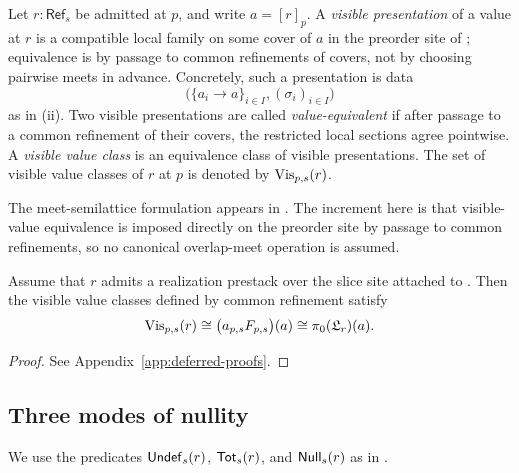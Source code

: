 \begin{definition}\label{def:visible-value-classes}
Let $r:\mathsf{Ref}_s$ be admitted at $p$, and write $a=[r]_p$. A \emph{visible presentation} of a value at $r$ is a compatible local family on some cover of $a$ in the preorder site of ; equivalence is by passage to common refinements of covers, not by choosing pairwise meets in advance. Concretely, such a presentation is data
\[
\bigl(\{a_i\to a\}_{i\in I},(\sigma_i)_{i\in I}\bigr)
\]
as in (ii). Two visible presentations are called \emph{value-equivalent} if after passage to a common refinement of their covers, the restricted local sections agree pointwise. A \emph{visible value class} is an equivalence class of visible presentations. The set of visible value classes of $r$ at $p$ is denoted by $\mathrm{Vis}_{p,s}(r)$.
\end{definition}

\begin{remark}
The meet-semilattice formulation appears in \cite[Definition~4.19]{MaZhang2026ConditionalGluingFailure}. The increment here is that visible-value equivalence is imposed directly on the preorder site by passage to common refinements, so no canonical overlap-meet operation is assumed.
\end{remark}

\begin{proposition}\label{thm:visible-value-components}
Assume that $r$ admits a realization prestack over the slice site attached to . Then the visible value classes defined by common refinement satisfy
\[
\mathrm{Vis}_{p,s}(r)\cong \bigl(a_{p,s}F_{p,s}\bigr)(a)\cong \pi_0(\mathfrak L_r)(a).
\]
\end{proposition}

\begin{proof}
See Appendix~\ref{app:deferred-proofs}.
\end{proof}

\subsection{Three modes of nullity}

\begin{definition}\label{def:undef-total-null}
We use the predicates $\mathsf{Undef}_s(r)$, $\mathsf{Tot}_s(r)$, and $\mathsf{Null}_s(r)$ as in \cite[Definition~4.25]{MaZhang2026ConditionalGluingFailure}.
\end{definition}

